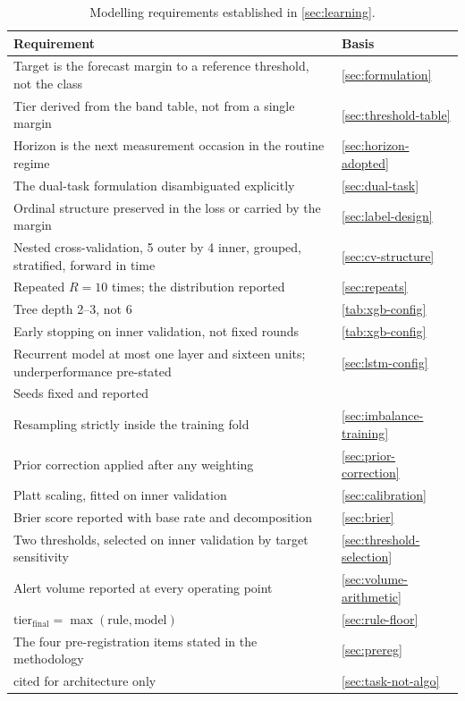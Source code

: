 \documentclass[12pt,a4paper,oneside]{report}
\begin{document}
\begin{table}[htbp]
\centering\footnotesize
\caption{Modelling requirements established in \cref{sec:learning}.}\label{tab:spec34}
\begin{tabularx}{\textwidth}{@{}X >{\raggedright\arraybackslash}p{5.2cm}@{}}
\toprule
\textbf{Requirement} & \textbf{Basis} \\
\midrule
Target is the forecast margin to a reference threshold, not the class & \cref{sec:formulation} \\
Tier derived from the band table, not from a single margin & \cref{sec:threshold-table} \\
Horizon is the next measurement occasion in the routine regime & \cref{sec:horizon-adopted} \\
The dual-task formulation disambiguated explicitly & \cref{sec:dual-task} \\
Ordinal structure preserved in the loss or carried by the margin & \cref{sec:label-design} \\
Nested cross-validation, 5 outer by 4 inner, grouped, stratified, forward in time & \cref{sec:cv-structure} \\
Repeated $R = 10$ times; the distribution reported & \cref{sec:repeats} \\
Tree depth 2--3, not 6 & \cref{tab:xgb-config} \\
Early stopping on inner validation, not fixed rounds & \cref{tab:xgb-config} \\
Recurrent model at most one layer and sixteen units; underperformance pre-stated & \cref{sec:lstm-config} \\
Seeds fixed and reported & \textcite{mendoza2025} \\
Resampling strictly inside the training fold & \cref{sec:imbalance-training} \\
Prior correction applied after any weighting & \cref{sec:prior-correction} \\
Platt scaling, fitted on inner validation & \cref{sec:calibration} \\
Brier score reported with base rate and decomposition & \cref{sec:brier} \\
Two thresholds, selected on inner validation by target sensitivity & \cref{sec:threshold-selection} \\
Alert volume reported at every operating point & \cref{sec:volume-arithmetic} \\
$\text{tier}_{\text{final}} = \max(\text{rule}, \text{model})$ & \cref{sec:rule-floor} \\
The four pre-registration items stated in the methodology & \cref{sec:prereg} \\
\textcite{efendi2025} cited for architecture only & \cref{sec:task-not-algo} \\
\bottomrule
\end{tabularx}
\end{table}
\end{document}
